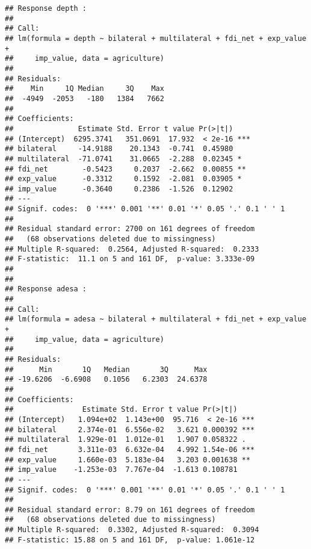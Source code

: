 \documentclass[
]{article}
\begin{document}
\begin{verbatim}
## Response depth :
## 
## Call:
## lm(formula = depth ~ bilateral + multilateral + fdi_net + exp_value + 
##     imp_value, data = agriculture)
## 
## Residuals:
##    Min     1Q Median     3Q    Max 
##  -4949  -2053   -180   1384   7662 
## 
## Coefficients:
##               Estimate Std. Error t value Pr(>|t|)    
## (Intercept)  6295.3741   351.0691  17.932  < 2e-16 ***
## bilateral     -14.9188    20.1343  -0.741  0.45980    
## multilateral  -71.0741    31.0665  -2.288  0.02345 *  
## fdi_net        -0.5423     0.2037  -2.662  0.00855 ** 
## exp_value      -0.3312     0.1592  -2.081  0.03905 *  
## imp_value      -0.3640     0.2386  -1.526  0.12902    
## ---
## Signif. codes:  0 '***' 0.001 '**' 0.01 '*' 0.05 '.' 0.1 ' ' 1
## 
## Residual standard error: 2700 on 161 degrees of freedom
##   (68 observations deleted due to missingness)
## Multiple R-squared:  0.2564, Adjusted R-squared:  0.2333 
## F-statistic:  11.1 on 5 and 161 DF,  p-value: 3.333e-09
## 
## 
## Response adesa :
## 
## Call:
## lm(formula = adesa ~ bilateral + multilateral + fdi_net + exp_value + 
##     imp_value, data = agriculture)
## 
## Residuals:
##      Min       1Q   Median       3Q      Max 
## -19.6206  -6.6908   0.1056   6.2303  24.6378 
## 
## Coefficients:
##                Estimate Std. Error t value Pr(>|t|)    
## (Intercept)   1.094e+02  1.143e+00  95.716  < 2e-16 ***
## bilateral     2.374e-01  6.556e-02   3.621 0.000392 ***
## multilateral  1.929e-01  1.012e-01   1.907 0.058322 .  
## fdi_net       3.311e-03  6.632e-04   4.992 1.54e-06 ***
## exp_value     1.660e-03  5.183e-04   3.203 0.001638 ** 
## imp_value    -1.253e-03  7.767e-04  -1.613 0.108781    
## ---
## Signif. codes:  0 '***' 0.001 '**' 0.01 '*' 0.05 '.' 0.1 ' ' 1
## 
## Residual standard error: 8.79 on 161 degrees of freedom
##   (68 observations deleted due to missingness)
## Multiple R-squared:  0.3302, Adjusted R-squared:  0.3094 
## F-statistic: 15.88 on 5 and 161 DF,  p-value: 1.061e-12
\end{verbatim}
\end{document}
